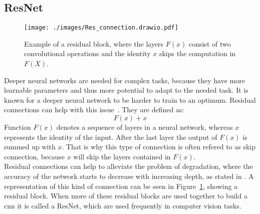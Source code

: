 \subsection{ResNet}\label{resnet}
\begin{figure}[bt]
    \begin{center}
     \texttt{[image: ./images/Res\_connection.drawio.pdf]}
    \caption[Residual block]{{Example of a residual block, where the layers $F(x)$ consist of two convolutional operations and the identity $x$ skips the computation in $F(X)$.}\label{res_block_figure}}
    \end{center}
\end{figure}
Deeper neural networks are needed for complex tasks, because they have more learnable parameters and thus more potential to adapt to the needed task.
It is known for a deeper neural network to be harder to train to an optimum.
Residual connections can help with this issue~\cite{He2015}.
They are defined as:
\begin{equation}
    F(x) + x
    \label{res_con}
\end{equation}
Function $F(x)$ denotes a sequence of layers in a neural network, whereas $x$ represents the identity of the input.
After the last layer the output of $F(x)$ is summed up with $x$.
That is why this type of connection is often refered to as skip connection, because $x$ will skip the layers contained in $F(x)$.\\
Residual connections can help to alleviate the problem of degradation, where the accuracy of the network starts to decrease with increasing depth, as stated in \cite{He2015}.
A representation of this kind of connection can be seen in Figure~\ref{res_block_figure}, showing a residual block.
When more of these residual blocks are used together to build a \acs{cnn} it is called a ResNet, which are used frequently in computer vision tasks.

